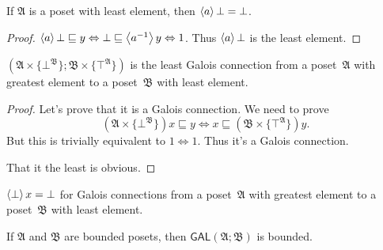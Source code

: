 
\begin{prop}\label{a-bot}
If $\mathfrak{A}$ is a poset with least element, then $\left\langle a\right\rangle\bot=\bot$.
\end{prop}

\begin{proof}
$\left\langle a\right\rangle\bot\sqsubseteq y\Leftrightarrow \bot\sqsubseteq\left\langle a^{-1}\right\rangle y\Leftrightarrow 1$.
Thus $\left\langle a\right\rangle\bot$ is the least element.
\end{proof}

\begin{prop}
$(\mathfrak{A}\times\{\bot^\mathfrak{B}\}; \mathfrak{B}\times\{\top^\mathfrak{A}\})$ is the least Galois connection from
a poset~$\mathfrak{A}$ with greatest element to a poset~$\mathfrak{B}$ with least element.
\end{prop}

\begin{proof}
Let's prove that it is a Galois connection. We need to prove
\[ (\mathfrak{A}\times\{\bot^\mathfrak{B}\})x\sqsubseteq y \Leftrightarrow x\sqsubseteq (\mathfrak{B}\times\{\top^\mathfrak{A}\})y. \]
But this is trivially equivalent to $1\Leftrightarrow 1$. Thus it's a Galois connection.

That it the least is obvious.
\end{proof}

\begin{cor}
$\left\langle \bot\right\rangle x=\bot$ for Galois connections from
a poset~$\mathfrak{A}$ with greatest element to a poset~$\mathfrak{B}$ with least element.
\end{cor}

\begin{thm}\label{gal-bound}
If $\mathfrak{A}$ and $\mathfrak{B}$ are bounded posets, then $\mathsf{GAL}(\mathfrak{A}; \mathfrak{B})$ is bounded.
\end{thm}

